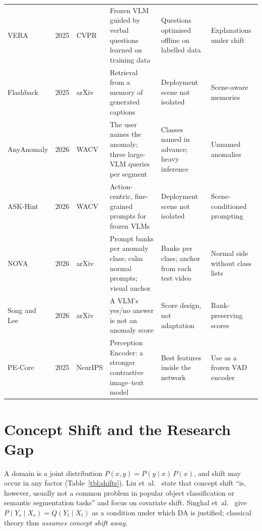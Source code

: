 \documentclass[conference,a4paper]{IEEEtran}
\begin{document}
\begin{table}[!t]
\begin{tabularx}{\textwidth}{@{}W{2.6cm} l W{1.3cm} Z Z Z@{}}
VERA \cite{ye2025vera} & 2025 & CVPR & Frozen VLM guided by verbal questions learned on training data & Questions optimised offline on labelled data & Explanations under shift \\
Flashback \cite{lee2025flashback} & 2025 & arXiv & Retrieval from a memory of generated captions & Deployment scene not isolated & Scene-aware memories \\
AnyAnomaly \cite{anyanomaly2025} & 2026 & WACV & The user names the anomaly; three large-VLM queries per segment & Classes named in advance; heavy inference & Unnamed anomalies \\
ASK-Hint \cite{zou2026askhint} & 2026 & WACV & Action-centric, fine-grained prompts for frozen VLMs & Deployment scene not isolated & Scene-conditioned prompting \\
NOVA \cite{yin2026nova} & 2026 & arXiv & Prompt banks per anomaly class; calm normal prompts; visual anchor & Banks per class; anchor from each test video & Normal side without class lists \\
Song and Lee \cite{song2026vlmanswer} & 2026 & arXiv & A VLM's yes/no answer is not an anomaly score & Score design, not adaptation & Rank-preserving scores \\
PE-Core \cite{bolya2025pe} & 2025 & NeurIPS & Perception Encoder: a stronger contrastive image--text model & Best features inside the network & Use as a frozen VAD encoder \\
\bottomrule
\end{tabularx}
\end{table}

\section{Concept Shift and the Research Gap}
\label{sec:gap}

A domain is a joint distribution $P(x,y)=P(y\mid x)\,P(x)$, and shift may occur
in any factor (Table~\ref{tbl:shifts}). Liu et~al.\ \cite{liu2022deep} state that
concept shift ``is, however, usually not a common problem in popular object
classification or semantic segmentation tasks'' and focus on covariate shift.
Singhal et~al.\ \cite{singhal2023domain} give $P(Y_s\mid X_s)=Q(Y_t\mid X_t)$ as a
condition under which DA is justified; classical theory thus \emph{assumes
concept shift away}.
\end{document}
